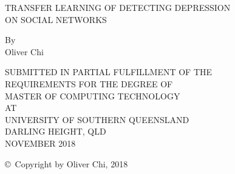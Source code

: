 \documentclass[12pt]{article}
\def\author{Oliver Chi}
\def\degree{Master of Computing Technology}
\def\title{Transfer Learning Of Detecting Depression \\
       On Social Networks}
\def\university{University Of Southern Queensland}
\def\address{Darling Height, QLD}
\def\submitdate{November 2018}
\def\copyrightyear{2018}
\begin{document}


	\thispagestyle{empty}
	\null\vskip0.5in
	\begin{center}
		\Large\uppercase\expandafter{\title}
	\end{center}
	\vfill
	\begin{center}
		\large\rm By\\
		\author
	\end{center}
	\vfill
	\begin{center}
		\footnotesize SUBMITTED IN PARTIAL FULFILLMENT OF THE \\
		REQUIREMENTS FOR THE DEGREE OF \\
		\uppercase\expandafter{\degree} \\
		AT \\
		\uppercase\expandafter{\university} \\
		\uppercase\expandafter{\address} \\
		\uppercase\expandafter{\submitdate}
	\end{center}
	\vskip0.75in
	\begin{center}
		\rm \copyright\ Copyright by \author, \copyrightyear
	\end{center}\newpage
\end{document}

